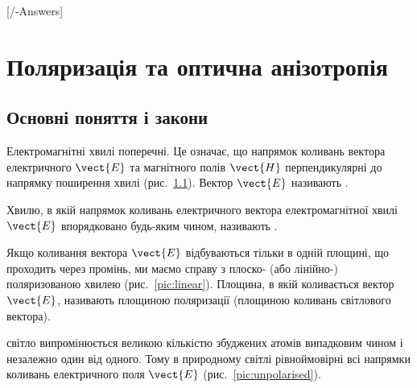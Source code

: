 
[\currfilebase/\currfilebase-Answers]
\chapter{Поляризація та оптична анізотропія}\label{\currfilebase}
\makeatletter
{}
\makeatother

\let\tss\textsuperscript %

\section{Основні поняття і закони}

Електромагнітні хвилі поперечні. Це означає, що напрямок коливань вектора електричного $ \vect{E} $ та магнітного полів $ \vect{H} $ перпендикулярні до напрямку поширення хвилі (рис.~\ref{pic:EM_wave}). Вектор $ \vect{E} $ називають .


\begin{figure}[h!]\centering

\caption{}
\label{pic:EM_wave}
\end{figure}



Хвилю, в якій напрямок коливань електричного вектора електромагнітної хвилі $ \vect{E} $ впорядковано будь-яким чином, називають .

Якщо коливання вектора $ \vect{E} $ відбуваються
тільки в одній площині, що проходить через промінь, ми маємо
справу з плоско- (або лінійно-) поляризованою хвилею (рис.~\ref{pic:linear}). Площина, в якій коливається вектор $ \vect{E} $, називають площиною
поляризації (площиною коливань світлового вектора).

 світло випромінюється великою кількістю збуджених атомів  випадковим чином і незалежно один від одного. Тому в природному світлі рівноймовірні всі напрямки коливань електричного поля $ \vect{E} $ (рис.~\ref{pic:unpolarised}).

